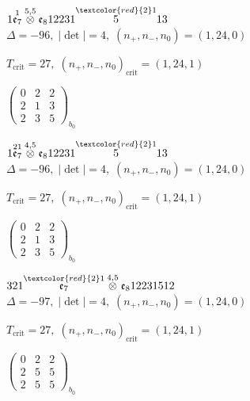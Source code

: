 \documentclass[10pt]{article}
\begin{document}
$1\overset{1}{\mathfrak{e}_7}\overset{5,5}{\otimes}\mathfrak{e}_812231\overset{\textcolor{red}{2}1}{5}13$ \quad $\Delta=-96,\; |\det|=4,\; (n_+,n_-,n_0)=(1,24,0)$

\hspace{1em}$T_{\text{crit}}=27,\; (n_+,n_-,n_0)_{\text{crit}}=(1,24,1)$

\hspace{2em}$\left(\begin{smallmatrix}0 & 2 & 2 \\ 2 & 1 & 3 \\ 2 & 3 & 5\end{smallmatrix}\right)_{\!b_0}$

\smallskip

$1\overset{21}{\mathfrak{e}_7}\overset{4,5}{\otimes}\mathfrak{e}_812231\overset{\textcolor{red}{2}1}{5}13$ \quad $\Delta=-96,\; |\det|=4,\; (n_+,n_-,n_0)=(1,24,0)$

\hspace{1em}$T_{\text{crit}}=27,\; (n_+,n_-,n_0)_{\text{crit}}=(1,24,1)$

\hspace{2em}$\left(\begin{smallmatrix}0 & 2 & 2 \\ 2 & 1 & 3 \\ 2 & 3 & 5\end{smallmatrix}\right)_{\!b_0}$

\smallskip

$321\overset{\textcolor{red}{2}1}{\mathfrak{e}_7}\overset{4,5}{\otimes}\mathfrak{e}_812231512$ \quad $\Delta=-97,\; |\det|=4,\; (n_+,n_-,n_0)=(1,24,0)$

\hspace{1em}$T_{\text{crit}}=27,\; (n_+,n_-,n_0)_{\text{crit}}=(1,24,1)$

\hspace{2em}$\left(\begin{smallmatrix}0 & 2 & 2 \\ 2 & 5 & 5 \\ 2 & 5 & 5\end{smallmatrix}\right)_{\!b_0}$

\smallskip
\end{document}
